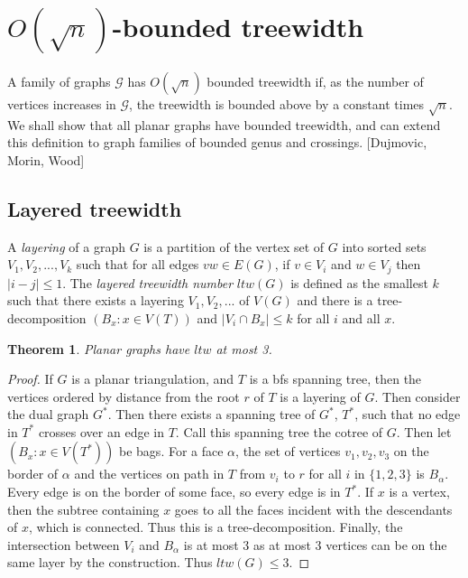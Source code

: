 \documentclass[]{article}
\newtheorem{theorem}{Theorem}
\theoremstyle{definition}
\numberwithin{theorem}{section}
\numberwithin{equation}{section}
\begin{document}
\section{$O(\sqrt{n})$-bounded treewidth}
\newcommand{\ltw}{\textit{ltw}}
A family of graphs $\mathcal{G}$ has $O(\sqrt{n})$ bounded treewidth if, as the number of vertices increases in $\mathcal{G}$, the treewidth is bounded above by a constant times $\sqrt{n}$. We shall show that all planar graphs have bounded treewidth, and can extend this definition to graph families of bounded genus and crossings. [Dujmovic, Morin, Wood] 

\subsection{Layered treewidth}
A \textit{layering} of a graph $G$ is a partition of the vertex set of $G$ into sorted sets $V_1, V_2, ..., V_k$ such that for all edges $vw \in E(G)$, if $v \in V_i$ and $w \in V_j$ then $|i - j| \leq 1$. The \textit{layered treewidth number} $\ltw(G)$ is defined as the smallest $k$ such that there exists a layering $V_1, V_2, ...$ of $V(G)$ and there is a tree-decomposition $(B_x: x \in V(T))$ and $|V_i \cap B_x| \leq k$ for all $i$ and all $x$. 
\begin{theorem}
	Planar graphs have $\ltw$ at most 3. 
\end{theorem}
\begin{proof}
	If $G$ is a planar triangulation, and $T$ is a bfs spanning tree, then the vertices ordered by distance from the root $r$ of $T$ is a layering of $G$. Then consider the dual graph $G^*$. Then there exists a spanning tree of $G^*$, $T^*$, such that no edge in $T^*$ crosses over an edge in $T$. Call this spanning tree the cotree of $G$. Then let $\left( B_x: x \in V(T^*) \right)$ be bags. For a face $\alpha$, the set of vertices $v_1, v_2, v_3$ on the border of $\alpha$ and the vertices on path in $T$ from $v_i$ to $r$ for all $i$ in $\lbrace 1, 2, 3 \rbrace$ is $B_\alpha$. Every edge is on the border of some face, so every edge is in $T^*$. If $x$ is a vertex, then the subtree containing $x$ goes to all the faces incident with the descendants of $x$, which is connected. Thus this is a tree-decomposition. Finally, the intersection between $V_i$ and $B_\alpha$ is at most 3 as at most 3 vertices can be on the same layer by the construction. Thus $ltw(G) \leq 3$. 
\end{proof}
\end{document}
